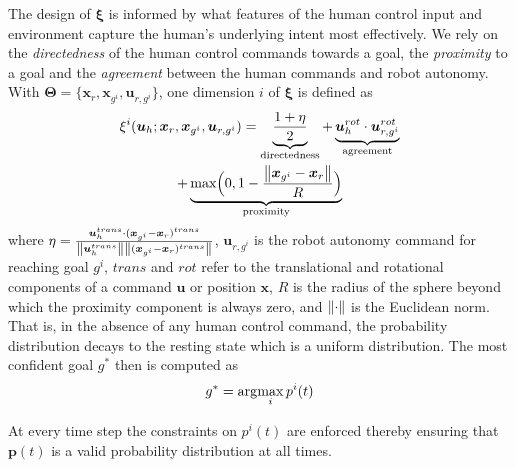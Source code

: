 The design of $\boldsymbol{\xi}$ is informed by what features of the human control input and environment capture the human's underlying intent most effectively. We rely on the \textit{directedness} of the human control commands towards a goal, the \textit{proximity} to a goal and the \textit{agreement} between the human commands and robot autonomy. 
With $\boldsymbol{\Theta} = \{\boldsymbol{x}_r, \boldsymbol{x}_{g^i}, \boldsymbol{u}_{r, g^i}\}$, one dimension $i$ of $\boldsymbol{\xi}$ is defined as 
\begin{multline}
\xi^i(\boldsymbol{u}_h;\boldsymbol{x}_r, \boldsymbol{x}_{g^i}, \boldsymbol{u}_{r, g^i}) = \underbrace{\frac{1 + \eta}{2}}_{\text{directedness}} + \underbrace{\boldsymbol{u}_{h}^{rot}\cdot\boldsymbol{u}_{r,g^i}^{rot}}_{\text{agreement}}
\\+ \underbrace{\text{max}\Big(0, 1-\frac{\left\lVert\boldsymbol{x}_{g^i} - \boldsymbol{x}_r\right\rVert}{R}\Big)}_{\text{proximity}}
\end{multline}
where  $\eta = \frac{\boldsymbol{u}_h^{trans}\cdot(\boldsymbol{x}_{g^i} - \boldsymbol{x}_r)^{trans}}{\left\lVert\boldsymbol{u}_h^{trans}\right\rVert\left\lVert(\boldsymbol{x}_{g^i} - \boldsymbol{x}_r)^{trans}\right\rVert}$, $\boldsymbol{u}_{r,g^i}$ is the robot autonomy command for reaching goal $g^i$, $trans$ and $rot$ refer to the translational and rotational components of a command $\boldsymbol{u}$ or position $\boldsymbol{x}$,  $R$ is the radius of the sphere beyond which the proximity component is always zero, and $\left\lVert\cdot\right\rVert$ is the Euclidean norm. That is, in the absence of any human control command, the probability distribution decays to the resting state which is a uniform distribution.  
The most confident goal $g^*$ then is computed as 
\begin{equation}
g^* = \arg\!\max_i  p^i(t)
\end{equation}

At every time step the constraints on $p^i(t)$ are enforced thereby ensuring that $\boldsymbol{p}(t)$ is a valid probability distribution at all times. 
	
